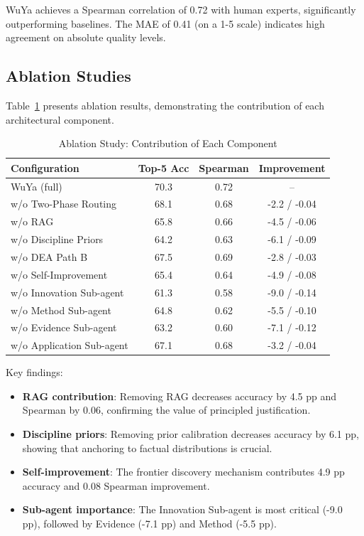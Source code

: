 \documentclass[11pt,a4paper]{article}
\begin{document}
WuYa achieves a Spearman correlation of 0.72 with human experts, significantly outperforming baselines. The MAE of 0.41 (on a 1-5 scale) indicates high agreement on absolute quality levels.

\subsection{Ablation Studies}

Table~\ref{tab:ablation} presents ablation results, demonstrating the contribution of each architectural component.

\begin{table}[t]
\centering
\caption{Ablation Study: Contribution of Each Component}
\label{tab:ablation}
\begin{tabular}{@{}lccc@{}}
\toprule
\textbf{Configuration} & \textbf{Top-5 Acc} & \textbf{Spearman} & \textbf{Improvement} \\
\midrule
WuYa (full) & 70.3 & 0.72 & -- \\
\midrule
w/o Two-Phase Routing & 68.1 & 0.68 & -2.2 / -0.04 \\
w/o RAG & 65.8 & 0.66 & -4.5 / -0.06 \\
w/o Discipline Priors & 64.2 & 0.63 & -6.1 / -0.09 \\
w/o DEA Path B & 67.5 & 0.69 & -2.8 / -0.03 \\
w/o Self-Improvement & 65.4 & 0.64 & -4.9 / -0.08 \\
\midrule
w/o Innovation Sub-agent & 61.3 & 0.58 & -9.0 / -0.14 \\
w/o Method Sub-agent & 64.8 & 0.62 & -5.5 / -0.10 \\
w/o Evidence Sub-agent & 63.2 & 0.60 & -7.1 / -0.12 \\
w/o Application Sub-agent & 67.1 & 0.68 & -3.2 / -0.04 \\
\bottomrule
\end{tabular}
\end{table}

Key findings:
\begin{itemize}
    \item \textbf{RAG contribution}: Removing RAG decreases accuracy by 4.5 pp and Spearman by 0.06, confirming the value of principled justification.
    \item \textbf{Discipline priors}: Removing prior calibration decreases accuracy by 6.1 pp, showing that anchoring to factual distributions is crucial.
    \item \textbf{Self-improvement}: The frontier discovery mechanism contributes 4.9 pp accuracy and 0.08 Spearman improvement.
    \item \textbf{Sub-agent importance}: The Innovation Sub-agent is most critical (-9.0 pp), followed by Evidence (-7.1 pp) and Method (-5.5 pp).
\end{itemize}
\end{document}
